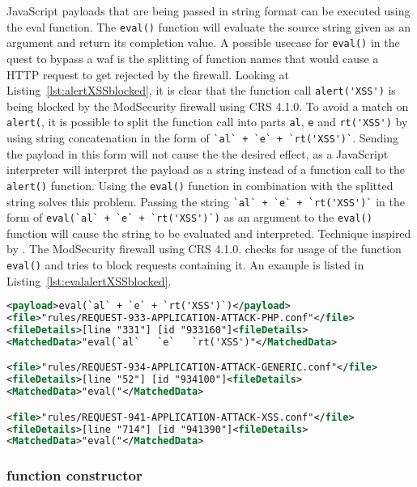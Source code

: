 JavaScript payloads that are being passed in string format can be executed using the eval function. The \verb|eval()| function will evaluate the source string given as an argument and return its completion value. \cite{js/eval}
A possible usecase for \verb|eval()| in the quest to bypass a \gls{waf} is the splitting of function names that would cause a HTTP request to get rejected by the firewall.
Looking at Listing~\ref{lst:alertXSSblocked}, it is clear that the function call \verb|alert('XSS')| is being blocked by the ModSecurity firewall using CRS 4.1.0.
To avoid a match on \verb|alert(|, it is possible to split the function call into parts \verb|al|, \verb|e| and \verb|rt('XSS')| by using string concatenation in the form of \verb|`al` + `e` + `rt('XSS')`|.
Sending the payload in this form will not cause the the desired effect, as a JavaScript interpreter will interpret the payload as a string instead of a function call to the \verb|alert()| function.
Using the \verb|eval()| function in combination with the splitted string solves this problem. Passing the string \verb|`al` + `e` + `rt('XSS')`| in the form of \verb|eval(`al` + `e` + `rt('XSS')`)| as an argument to the \verb|eval()| function will cause the string to be evaluated and interpreted. Technique inspired by \cite{onecons/wafbypass}.
The ModSecurity firewall using CRS 4.1.0. checks for usage of the function \verb|eval()| and tries to block requests containing it. An example is listed in Listing~\ref{lst:evalalertXSSblocked}.

\begin{lstlisting}[style=ruleStyle, language=XML, caption=eval(`al` + `e` + `rt('XSS')`) blocking example, label={lst:evalalertXSSblocked}]
<payload>eval(`al` + `e` + `rt('XSS')`)</payload>
<file>"rules/REQUEST-933-APPLICATION-ATTACK-PHP.conf"</file>
<fileDetails>[line "331"] [id "933160"]<fileDetails>
<MatchedData>"eval(`al`   `e`   `rt('XSS')"</MatchedData>

<file>"rules/REQUEST-934-APPLICATION-ATTACK-GENERIC.conf"</file>
<fileDetails>[line "52"] [id "934100"]<fileDetails>
<MatchedData>"eval("</MatchedData>

<file>"rules/REQUEST-941-APPLICATION-ATTACK-XSS.conf"</file>
<fileDetails>[line "714"] [id "941390"]<fileDetails>
<MatchedData>"eval("</MatchedData>
\end{lstlisting}

\subsubsection{function constructor}
\label{sec:functionconstructor}

